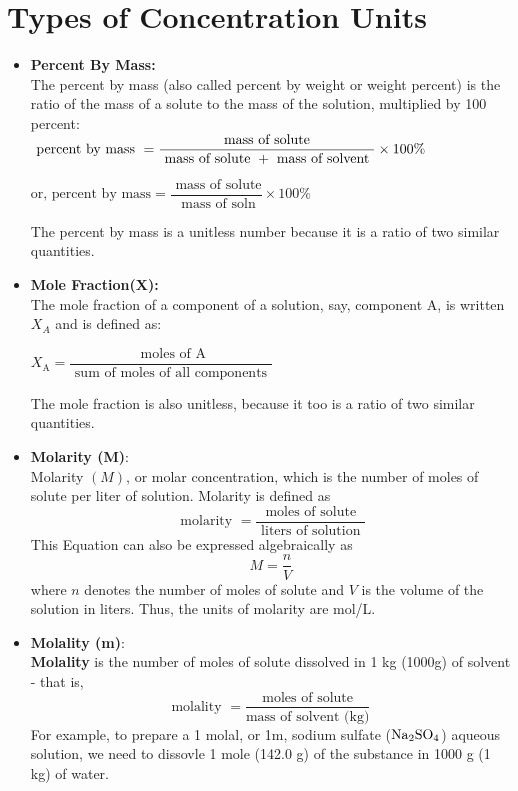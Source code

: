 \documentclass[a4paper,12pt,twocolumn]{article}
\begin{document}
\section{Types of Concentration Units}
\begin{itemize}
\item \textbf{Percent By Mass:}\\
The percent by mass (also called percent by weight or weight percent) is the ratio of the mass of a solute to the mass of the solution, multiplied by 100 percent:\\
$\text { percent by mass } \\ =\dfrac{\text { mass of solute }}{\text { mass of solute }+ \text { mass of solvent }} \times 100 \%$

\begin{center}
$\text {or,  percent by mass}=\dfrac{\text { mass of solute}}{\text { mass of soln}} \times 100 \%$
\end{center}
The percent by mass is a unitless number because it is a ratio of two similar quantities.

\item \textbf{Mole Fraction(X):}\\ 
The mole fraction of a component
of a solution, say, component A, is written $X_A$ and is defined as:
\begin{center}
$X_{\mathrm{A}}=\dfrac{\text { moles of } \mathrm{A}}{\text { sum of moles of all components }}$
\end{center}

The mole fraction is also unitless, because it too is a ratio of two similar quantities.

\item \textbf{Molarity (M)}:\\ 
Molarity $(M)$, or molar concentration, which is the number of moles of solute per liter of solution. Molarity is defined as
$$
\text { molarity }=\dfrac{\text { moles of solute }}{\text { liters of solution }}
$$
This Equation can also be expressed algebraically as
$$
M=\dfrac{n}{V}
$$
where $n$ denotes the number of moles of solute and $V$ is the volume of the solution in liters.
Thus, the units of molarity are mol/L.
\item \textbf{Molality (m)}: \\
\textbf{Molality} is the number of moles of solute dissolved in 1 kg (1000g) of solvent - that is,
$$\text{molality } = \dfrac{\text {moles of solute}}{\text{mass of solvent (kg)}}$$
For example, to prepare a 1 molal, or 1m, sodium sulfate ($\ce{Na2SO4}$) aqueous solution, we need to dissovle 1 mole (142.0 g) of the substance in 1000 g (1 kg) of water. 
\end{itemize}
\end{document}
